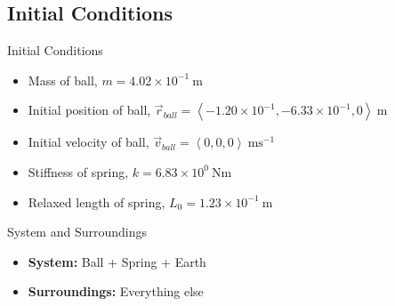 





\subsection{Initial Conditions}
\begin{frame}{Initial Conditions}
	\begin{itemize}
	\item Mass of ball, \(m = 4.02\times 10^{-1}\ \mathrm{m}\)
	\item Initial position of ball, \(\vec{r}_{ball} = \left\langle-1.20\times 10^{-1},-6.33\times 10^{-1},0\right\rangle\ \mathrm{m}\)
	\item Initial velocity of ball, \(\vec{v}_{ball} = \left\langle0,0,0\right\rangle\ \mathrm{ms^{-1}}\)
	\item Stiffness of spring, \(k = 6.83\times 10^{0} \ \mathrm{Nm}\)
	\item Relaxed length of spring, \(L_0 = 1.23\times 10^{-1} \ \mathrm{m} \)
	\end{itemize}
\end{frame}

\begin{frame}{System and Surroundings}
	\begin{itemize}
	\item \textbf{System:} Ball + Spring + Earth
	\item \textbf{Surroundings:} Everything else
	\end{itemize}
\end{frame}

